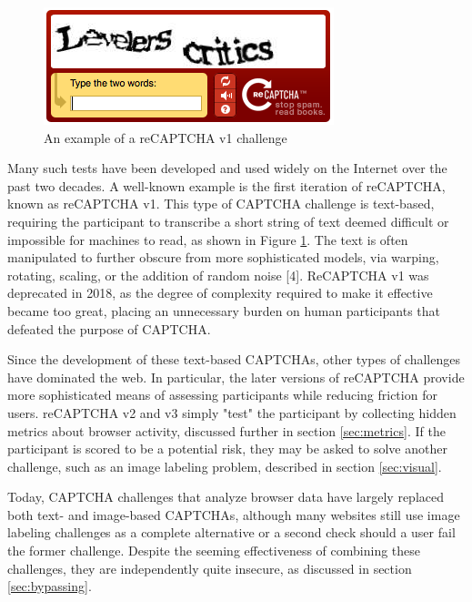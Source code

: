 \documentclass[sigplan,screen,nonacm]{acmart-tagged}
\begin{document}
\begin{figure}[h]
\centering
\includegraphics[width=1\linewidth]{resources/v1}
\caption{An example of a reCAPTCHA v1 challenge}
\label{fig:v1}
\end{figure}

Many such tests have been developed and used widely on the Internet over the past two decades. A well-known example is the first iteration of reCAPTCHA, known as reCAPTCHA v1. This type of CAPTCHA challenge is text-based, requiring the participant to transcribe a short string of text deemed difficult or impossible for machines to read, as shown in Figure \ref{fig:v1}. The text is often manipulated to further obscure from more sophisticated models, via warping, rotating, scaling, or the addition of random noise [4]. ReCAPTCHA v1 was deprecated in 2018, as the degree of complexity required to make it effective became too great, placing an unnecessary burden on human participants that defeated the purpose of CAPTCHA.

Since the development of these text-based CAPTCHAs, other types of challenges have dominated the web. In particular, the later versions of reCAPTCHA provide more sophisticated means of assessing participants while reducing friction for users. reCAPTCHA v2 and v3 simply "test" the participant by collecting hidden metrics about browser activity, discussed further in section \ref{sec:metrics}. If the participant is scored to be a potential risk, they may be asked to solve another challenge, such as an image labeling problem, described in section \ref{sec:visual}.

Today, CAPTCHA challenges that analyze browser data have largely replaced both text- and image-based CAPTCHAs, although many websites still use image labeling challenges as a complete alternative or a second check should a user fail the former challenge. Despite the seeming effectiveness of combining these challenges, they are independently quite insecure, as discussed in section \ref{sec:bypassing}.
\end{document}
